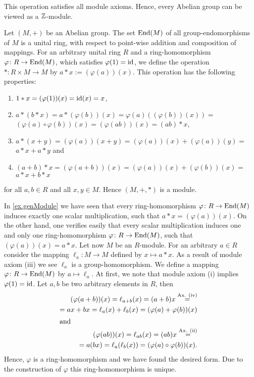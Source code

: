 \begin{exam}
\begin{exlist}
\begin{equation*}
\end{equation*}
This operation satisfies all module axioms. Hence, every Abelian group can be viewed as a $\operatorname{\mathbb{Z}}$-module.
\item \label{ex.genModule} Let $(M,+)$ be an Abelian group. The set $\operatorname{\mathrm{End}}(M)$ of all group-endomorphisms of $M$ is a unital ring, with respect to point-wise addition and composition of mappings. For an arbitrary unital ring $R$ and a ring-homomorphism $\varphi\colon R\to\operatorname{\mathrm{End}}(M)$, which satisfies $\varphi(1)=\operatorname{id}$, we define the operation $\ast\colon R\times M\rightarrow M$ by $a\ast x:=(\varphi (a))(x)$. This operation has the following properties:
\begin{enumerate}
\item $1\ast x=(\varphi(1))(x)=\operatorname{id}(x)=x$,
\item $a\ast(b\ast x)=a\ast(\varphi(b))(x)=\varphi(a)((\varphi(b))(x))=$\\
$(\varphi(a)\circ \varphi(b))(x)=(\varphi(ab))(x)=(ab)\ast x$,
\item $a\ast(x+y)=(\varphi(a))(x+y)=(\varphi(a))(x)+(\varphi(a))(y)=$\\
$a\ast x+a\ast y$ and
\item $(a+b)\ast x= (\varphi(a+b))(x)=(\varphi(a))(x)+(\varphi(b))(x)=$\\
$a\ast x+b\ast x$
\end{enumerate}
for all $a,b\in R$ and all $x,y\in M$. Hence $(M,+,\ast)$ is a module.
\end{exlist}
\end{exam}

In \cref{ex.genModule} we have seen that every ring-ho\-mo\-morph\-ism $\varphi\colon R\rightarrow\operatorname{\mathrm{End}}(M)$ induces exactly one scalar multiplication, such that $a\ast x=(\varphi(a))(x)$. On the other hand, one verifies easily that every scalar multiplication induces one and only one ring-ho\-mo\-morph\-ism $\varphi\colon R\rightarrow\operatorname{\mathrm{End}}(M)$, such that $(\varphi(a))(x)=a\ast x$. Let now $M$ be an $R$-module. For an arbitrary $a\in R$ consider the mapping $\ell_a\colon M\rightarrow M$ defined by $x\mapsto a\ast x$. As a result of module axiom (iii) we see $\ell_a$ is a group-homomorphism. We define a mapping $\varphi\colon R\rightarrow \operatorname{\mathrm{End}}(M)$ by $a \mapsto \ell_a$. At first, we note that module axiom (i) implies $\varphi(1)=\operatorname{id}$. Let $a,b$ be two arbitrary elements in $R$, then
\begin{align*}
(\varphi(a+b))(x)=\ell_{a+b}(x)=(a+b)x\overset{\text{Ax. (iv)}}{=}\\
=ax+bx=\ell_a(x)+\ell_b(x)=(\varphi(a)+\varphi(b))(x)\\
\intertext{and}
(\varphi(ab))(x)=\ell_{ab}(x)=(ab)x\overset{\text{Ax. (ii)}}{=}\\
=a(bx)=\ell_a(\ell_b(x))=(\varphi(a)\circ \varphi(b))(x).
\end{align*}
Hence, $\varphi$ is a ring-ho\-mo\-morph\-ism and we have found the desired form. Due to the construction of $\varphi$ this ring-homomorphism is  unique. 

